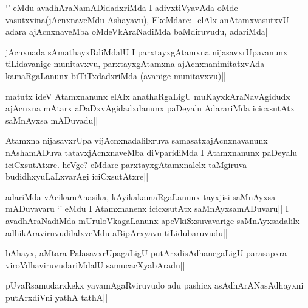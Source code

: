 \begin{artha}
`\stext' eMdu avadhAraNamADidadxriMda I adivxtiVyavAda oMde vasutxvina(jAcnxnaveMdu Ashayavu), EkeMdare:- elAlx anAtamxvasutxvU adara ajAcnxnaveMba oMdeVkAraNadiMda baMdiruvudu, adariMda||
\end{artha}

\begin{artha}
jAcnxnada sAmathayxRdiMdalU I parxtayxgAtamxna nijasavxrUpavanunx tiLidavanige munitavxvu, parxtayxgAtamxna ajAcnxnanimitatxvAda kamaRgaLanunx biTiTxdadxriMda (avanige munitavxvu)||
\end{artha}


\begin{artha}
matutx ideV Atamxnanunx elAlx anathaRgaLigU muKayxkAraNavAgidudx ajAcnxna mAtarx aDaDxvAgidadxdanunx paDeyalu AdarariMda icicxsutAtx saMnAyxsa mADuvadu||
\end{artha}


\begin{artha}
Atamxna nijasavxrUpa vijAcnxnadalilxruva samasatxajAcnxnavanunx nAshamADuva tatavxjAcnxnaveMba diVparidiMda I Atamxnanunx paDeyalu iciCxsutAtxre. heVge? eMdare-parxtayxgAtamxnalelx taMgiruva budidhxyuLaLxvarAgi iciCxsutAtxre||
\end{artha}

\begin{artha}
adariMda vAcikamAnasika, kAyikakamaRgaLanunx tayxjisi saMnAyxsa mADuvavaru `\stext' eMdu I Atamxnanenx icicxsutAtx saMnAyxsamADuvaru|| I avadhAraNadiMda mUruloVkagaLanunx apeVkiSxsuvavarige saMnAyxsadalilx adhikAraviruvudilalxveMdu aBipArxyavu tiLidubaruvudu||
\end{artha}


\begin{artha}
bAhayx, aMtara PalasavxrUpagaLigU putArxdisAdhanegaLigU parasapxra viroVdhaviruvudariMdalU samucacXyabAradu||
\end{artha}


\begin{artha}
pUvaRsamudarxkekx yavamAgaRviruvudo adu pashicx asAdhArANasAdhayxni putArxdiVni yathA 
tathA||
\end{artha}

